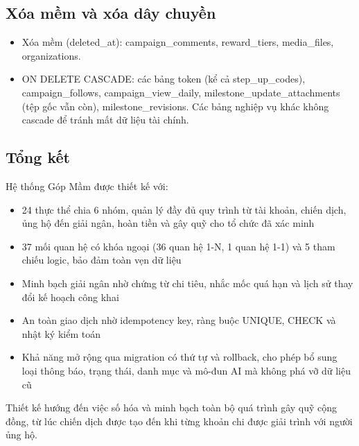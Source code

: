 \subsection{Xóa mềm và xóa dây chuyền}

\begin{itemize}
    \item Xóa mềm (deleted\_\allowbreak{}at): campaign\_\allowbreak{}comments, reward\_\allowbreak{}tiers, media\_\allowbreak{}files, organizations.
    \item ON DELETE CASCADE: các bảng token (kể cả step\_\allowbreak{}up\_\allowbreak{}codes), campaign\_\allowbreak{}follows, campaign\_\allowbreak{}view\_\allowbreak{}daily, milestone\_\allowbreak{}update\_\allowbreak{}attachments (tệp gốc vẫn còn), milestone\_\allowbreak{}revisions. Các bảng nghiệp vụ khác không cascade để tránh mất dữ liệu tài chính.
\end{itemize}

\subsection{Tổng kết}

Hệ thống Góp Mầm được thiết kế với:

\begin{itemize}
    \item 24 thực thể chia 6 nhóm, quản lý đầy đủ quy trình từ tài khoản, chiến dịch, ủng hộ đến giải ngân, hoàn tiền và gây quỹ cho tổ chức đã xác minh
    \item 37 mối quan hệ có khóa ngoại (36 quan hệ 1-N, 1 quan hệ 1-1) và 5 tham chiếu logic, bảo đảm toàn vẹn dữ liệu
    \item Minh bạch giải ngân nhờ chứng từ chi tiêu, nhắc mốc quá hạn và lịch sử thay đổi kế hoạch công khai
    \item An toàn giao dịch nhờ idempotency key, ràng buộc UNIQUE, CHECK và nhật ký kiểm toán
    \item Khả năng mở rộng qua migration có thứ tự và rollback, cho phép bổ sung loại thông báo, trạng thái, danh mục và mô-đun AI mà không phá vỡ dữ liệu cũ
\end{itemize}

Thiết kế hướng đến việc số hóa và minh bạch toàn bộ quá trình gây quỹ cộng đồng, từ lúc chiến dịch được tạo đến khi từng khoản chi được giải trình với người ủng hộ.
